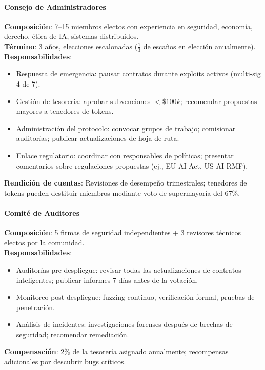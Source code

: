 \documentclass[11pt]{article}
\begin{document}
\paragraph{Consejo de Administradores}
\textbf{Composición}: 7--15 miembros electos con experiencia en seguridad, economía, derecho, ética de IA, sistemas distribuidos.\\
\textbf{Término}: 3 años, elecciones escalonadas ($\frac{1}{3}$ de escaños en elección anualmente).\\
\textbf{Responsabilidades}:
\begin{itemize}[noitemsep]
  \item Respuesta de emergencia: pausar contratos durante exploits activos (multi-sig 4-de-7).
  \item Gestión de tesorería: aprobar subvenciones $<\$100k$; recomendar propuestas mayores a tenedores de tokens.
  \item Administración del protocolo: convocar grupos de trabajo; comisionar auditorías; publicar actualizaciones de hoja de ruta.
  \item Enlace regulatorio: coordinar con responsables de políticas; presentar comentarios sobre regulaciones propuestas (ej., EU AI Act, US AI RMF).
\end{itemize}
\textbf{Rendición de cuentas}: Revisiones de desempeño trimestrales; tenedores de tokens pueden destituir miembros mediante voto de supermayoría del 67\%.

\paragraph{Comité de Auditores}
\textbf{Composición}: 5 firmas de seguridad independientes + 3 revisores técnicos electos por la comunidad.\\
\textbf{Responsabilidades}:
\begin{itemize}[noitemsep]
  \item Auditorías pre-despliegue: revisar todas las actualizaciones de contratos inteligentes; publicar informes 7 días antes de la votación.
  \item Monitoreo post-despliegue: fuzzing continuo, verificación formal, pruebas de penetración.
  \item Análisis de incidentes: investigaciones forenses después de brechas de seguridad; recomendar remediación.
\end{itemize}
\textbf{Compensación}: 2\% de la tesorería asignado anualmente; recompensas adicionales por descubrir bugs críticos.
\end{document}

